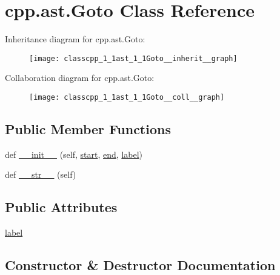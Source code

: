 \hypertarget{classcpp_1_1ast_1_1Goto}{}\section{cpp.\+ast.\+Goto Class Reference}
\label{classcpp_1_1ast_1_1Goto}


Inheritance diagram for cpp.\+ast.\+Goto\+:\nopagebreak
\begin{figure}[H]
\begin{center}
\leavevmode
\texttt{[image: classcpp\_1\_1ast\_1\_1Goto\_\_inherit\_\_graph]}
\end{center}
\end{figure}


Collaboration diagram for cpp.\+ast.\+Goto\+:\nopagebreak
\begin{figure}[H]
\begin{center}
\leavevmode
\texttt{[image: classcpp\_1\_1ast\_1\_1Goto\_\_coll\_\_graph]}
\end{center}
\end{figure}
\subsection*{Public Member Functions}
\begin{DoxyCompactItemize}
\item 
def \hyperlink{classcpp_1_1ast_1_1Goto_a928e79374a90d01fc060985ea1e45260}{\+\_\+\+\_\+init\+\_\+\+\_\+} (self, \hyperlink{classcpp_1_1ast_1_1Node_a7b2aa97e6a049bb1a93aea48c48f1f44}{start}, \hyperlink{classcpp_1_1ast_1_1Node_a3c5e5246ccf619df28eca02e29d69647}{end}, \hyperlink{classcpp_1_1ast_1_1Goto_a685284ea5f3b21f39aff7f5db841c8f5}{label})
\item 
def \hyperlink{classcpp_1_1ast_1_1Goto_a508b6bc091cf06bfed73a33368c236c9}{\+\_\+\+\_\+str\+\_\+\+\_\+} (self)
\end{DoxyCompactItemize}
\subsection*{Public Attributes}
\begin{DoxyCompactItemize}
\item 
\hyperlink{classcpp_1_1ast_1_1Goto_a685284ea5f3b21f39aff7f5db841c8f5}{label}
\end{DoxyCompactItemize}


\subsection{Constructor \& Destructor Documentation}
